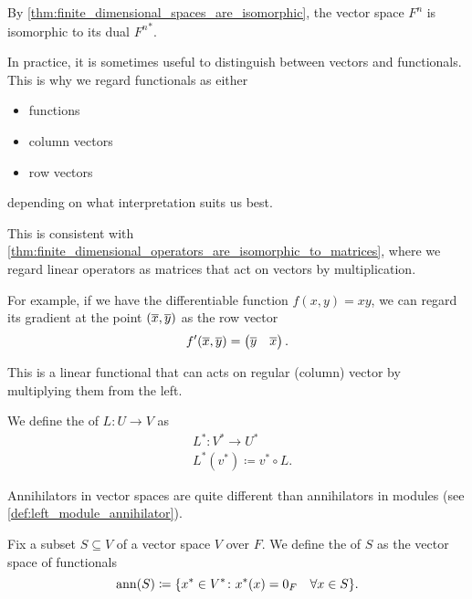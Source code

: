 \begin{remark}\label{remark:finite_dimensional_dual_space_isomorphism}
  By \cref{thm:finite_dimensional_spaces_are_isomorphic}, the vector space \( F^n \) is isomorphic to its dual \( {F^n}^* \).

  In practice, it is sometimes useful to distinguish between vectors and functionals. This is why we regard functionals as either
  \begin{itemize}
    \item functions
    \item column vectors
    \item row vectors
  \end{itemize}
  depending on what interpretation suits us best.

  This is consistent with \cref{thm:finite_dimensional_operators_are_isomorphic_to_matrices}, where we regard linear operators as matrices that act on vectors by multiplication.

  For example, if we have the differentiable function \( f(x, y) = xy \), we can regard its gradient at the point \( (\overline{x}, \overline{y}) \) as the row vector
  \begin{align*}
    f'(\overline{x}, \overline{y}) =
    \begin{pmatrix}
      \overline{y} & \overline{x}
    \end{pmatrix}.
  \end{align*}

  This is a linear functional that can acts on regular (column) vector by multiplying them from the left.
\end{remark}

\begin{definition}\label{def:dual_linear_operator}
  We define the  of \( L: U \to V \) as
  \begin{align*}
    &L^*: V^* \to U^* \\
    &L^*(v^*) \coloneqq v^* \circ L.
  \end{align*}
\end{definition}

\begin{definition}\label{def:vector_space_annihilator}\cite[52]{Knapp2016BAlg}
  Annihilators in vector spaces are quite different than annihilators in modules (see \cref{def:left_module_annihilator}).

  Fix a subset \( S \subseteq V \) of a vector space \( V \) over \( F \). We define the  of \( S \) as the vector space of functionals
  \begin{equation*}
    \operatorname{ann}(S) \coloneqq \{ x^* \in V^* \colon x^*(x) = 0_F \quad\forall x \in S \}.
  \end{equation*}
\end{definition}
